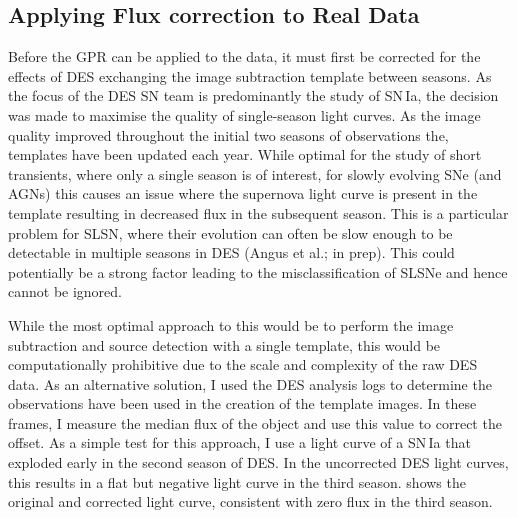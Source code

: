 \subsection{Applying Flux correction to Real Data}
Before the GPR can be applied to the data, it must first be corrected for the effects of DES exchanging the image subtraction template between seasons. As the focus of the DES SN team is predominantly the study of SN\,Ia, the decision was made to maximise the quality of single-season light curves. As the image quality improved throughout the initial two seasons of observations the, templates have been updated each year. While optimal for the study of short transients, where only a single season is of interest, for slowly evolving SNe (and AGNs) this causes an issue where the supernova light curve is present in the template resulting in decreased flux in the subsequent season. This is a particular problem for SLSN, where their evolution can often be slow enough to be detectable in multiple seasons in DES (Angus et al.; in prep). This could potentially be a strong factor leading to the misclassification of SLSNe and hence cannot be ignored.

While the most optimal approach to this would be to perform the image subtraction and source detection with a single template, this would be computationally prohibitive due to the scale and complexity of the raw DES data. As an alternative solution, I used the DES analysis logs to determine the observations have been used in the creation of the template images. In these frames, I measure the median flux of the object and use this value to correct the offset. As a simple test for this approach, I use a light curve of a SN\,Ia that exploded early in the second season of DES. In the uncorrected DES light curves, this results in a flat but negative light curve in the third season.  shows the original and corrected light curve, consistent with zero flux in the third season.

\begin{figure}
  \caption{}
  \label{fig:FluxOffset}
\end{figure}

